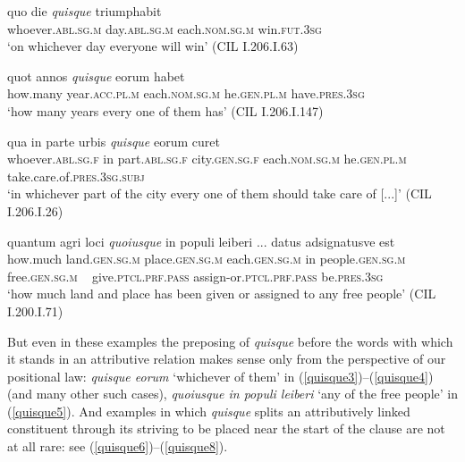 \begin{exe}
\ex
\gll quo die \emph{quisque} triumphabit\\
whoever.\textsc{abl.sg.m} day.\textsc{abl.sg.m} each.\textsc{nom.sg.m} win.\textsc{fut.3sg}\\
\trans `on whichever day everyone will win' (CIL I.206.I.63) 
\label{quisque2}
\end{exe}

\begin{exe}
\ex
\gll quot annos \emph{quisque} eorum habet\\
how.many year.\textsc{acc.pl.m} each.\textsc{nom.sg.m} he.\textsc{gen.pl.m} have.\textsc{pres.3sg}\\
\trans `how many years every one of them has' (CIL I.206.I.147) 
\label{quisque3}
\end{exe}%

\begin{exe}
\ex
\gll qua in parte urbis \emph{quisque} eorum curet\\
whoever.\textsc{abl.sg.f} in part.\textsc{abl.sg.f} city.\textsc{gen.sg.f} each.\textsc{nom.sg.m} he.\textsc{gen.pl.m} take.care.of.\textsc{pres.3sg.subj}\\
\trans `in whichever part of the city every one of them should take care of [...]' (CIL I.206.I.26) 
\label{quisque4}
\end{exe}

\begin{exe}
\ex
\gll quantum agri loci \emph{quoiusque} in populi leiberi ... datus adsignatusve est\\
how.much land.\textsc{gen.sg.m} place.\textsc{gen.sg.m} each.\textsc{gen.sg.m} in people.\textsc{gen.sg.m} free.\textsc{gen.sg.m} ~ give.\textsc{ptcl.prf.pass} assign-or.\textsc{ptcl.prf.pass} be.\textsc{pres.3sg}\\
\trans `how much land and place has been given or assigned to any free people' (CIL I.200.I.71) 
\label{quisque5}
\end{exe}

But even in these examples the preposing of \emph{quisque} before the words with which it stands in an attributive relation makes sense only from the perspective of our positional law: \emph{quisque eorum} `whichever of them' in (\ref{quisque3})--(\ref{quisque4}) (and many other such cases), \emph{quoiusque in populi leiberi} `any of the free people' in (\ref{quisque5}). And examples in which \emph{quisque} splits an attributively linked constituent through its striving to be placed near the start of the clause are not at all rare: see (\ref{quisque6})--(\ref{quisque8}).

